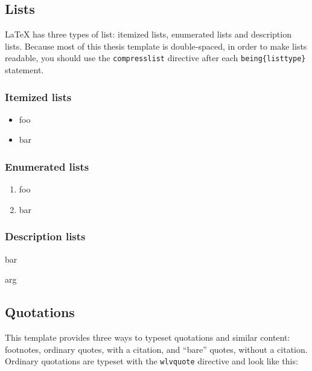 \subsection{Lists} 

\LaTeX{} has three types of list: itemized lists, enumerated lists and
description lists. Because most of this thesis template is
double-spaced, in order to make lists readable, you should use the
\verb!compresslist! directive after each \verb!being{listtype}!
statement. 

\subsubsection{Itemized lists}

\begin{itemize}\compresslist{}
\item foo
\item bar
\end{itemize}

\subsubsection{Enumerated lists}

\begin{enumerate}\compresslist{}
\item foo
\item bar
\end{enumerate}

\subsubsection{Description lists}

\begin{description}\compresslist{}
\item [foo] bar
\item [baz] arg
\end{description}

\subsection{Quotations}

This template provides three ways to typeset quotations and similar
content: footnotes, ordinary quotes,
with a citation, and ``bare'' quotes, without a citation. Ordinary
quotations are typeset with the \verb!wlvquote! directive and look
like this:

